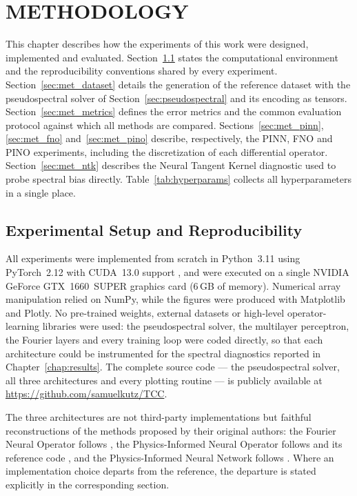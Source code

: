 \chapter{METHODOLOGY}
\label{chap:methodology}

This chapter describes how the experiments of this work were designed, implemented and evaluated. Section~\ref{sec:met_setup} states the computational environment and the reproducibility conventions shared by every experiment. Section~\ref{sec:met_dataset} details the generation of the reference dataset with the pseudospectral solver of Section~\ref{sec:pseudospectral} and its encoding as tensors. Section~\ref{sec:met_metrics} defines the error metrics and the common evaluation protocol against which all methods are compared. Sections~\ref{sec:met_pinn}, \ref{sec:met_fno} and~\ref{sec:met_pino} describe, respectively, the PINN, FNO and PINO experiments, including the discretization of each differential operator. Section~\ref{sec:met_ntk} describes the Neural Tangent Kernel diagnostic used to probe spectral bias directly. Table~\ref{tab:hyperparams} collects all hyperparameters in a single place.

\section{Experimental Setup and Reproducibility}
\label{sec:met_setup}

All experiments were implemented from scratch in Python~3.11 using PyTorch~2.12 with CUDA~13.0 support \parencite{paszke2019pytorch}, and were executed on a single NVIDIA GeForce GTX~1660~SUPER graphics card (6\,GB of memory). Numerical array manipulation relied on NumPy, while the figures were produced with Matplotlib and Plotly. No pre-trained weights, external datasets or high-level operator-learning libraries were used: the pseudospectral solver, the multilayer perceptron, the Fourier layers and every training loop were coded directly, so that each architecture could be instrumented for the spectral diagnostics reported in Chapter~\ref{chap:results}. The complete source code --- the pseudospectral solver, all three architectures and every plotting routine --- is publicly available at \url{https://github.com/samuelkutz/TCC}.

The three architectures are not third-party implementations but faithful reconstructions of the methods proposed by their original authors: the Fourier Neural Operator follows \textcite{li2020fourier, li2021}, the Physics-Informed Neural Operator follows \textcite{li2023pino} and its reference code \parencite{li2023pino_code}, and the Physics-Informed Neural Network follows \textcite{raissi2019}. Where an implementation choice departs from the reference, the departure is stated explicitly in the corresponding section.

